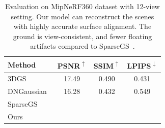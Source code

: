 \begin{table}[ht!]
    \centering
    \footnotesize
    \setlength{\tabcolsep}{2pt}
    \begin{tabular}{lccc}
    \toprule
     Method & PSNR\textsuperscript{$\uparrow$} & SSIM\textsuperscript{$\uparrow$} & LPIPS\textsuperscript{$\downarrow$}\\
     \midrule
 3DGS~\cite{3dgs2023} & \cellcolor{tab_color!10}17.49 & \cellcolor{tab_color!10}0.490 & \cellcolor{tab_color!10}0.431 \\
 DNGaussian~\cite{DNGaussian} & 16.28 & 0.432 & 0.549 \\
 SparseGS~\cite{SparseGS} & \cellcolor{tab_color!30}{19.37} & \cellcolor{tab_color!50}{0.577} & \cellcolor{tab_color!30}{0.398} \\
 Ours & \cellcolor{tab_color!50}{19.54} & \cellcolor{tab_color!30}{0.492} & \cellcolor{tab_color!50}{0.362}\\
    \bottomrule
    \end{tabular}
    \caption{Evaluation on MipNeRF360 dataset with 12-view setting. Our model can reconstruct the scenes with highly accurate surface alignment. The ground is view-consistent, and fewer floating artifacts compared to SparseGS~\cite{SparseGS}.}
    \label{tab:evaluation_mipnerf360_12view}
\end{table}